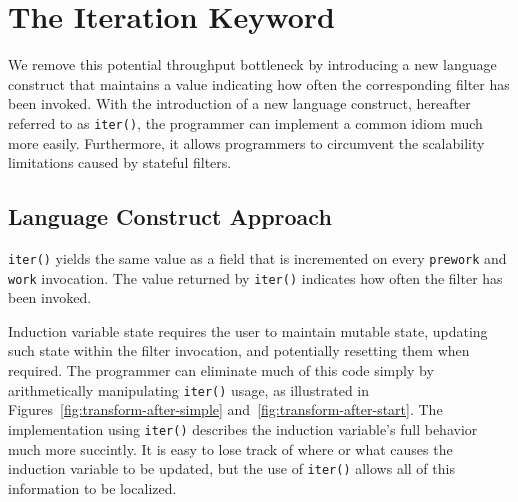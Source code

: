 %  
%
%
%
%
%
%    
%
%

\section{The Iteration Keyword}
\label{sec:iteration}
We remove this potential throughput bottleneck by 
introducing a new language construct that maintains a value 
indicating how often the corresponding filter has been invoked.  
With the introduction of a new language construct, hereafter referred to as {\tt iter()}, the programmer can implement a common idiom much more easily.  Furthermore, it allows programmers to circumvent the scalability limitations caused by stateful filters.

\subsection{Language Construct Approach}
{\tt iter()} yields the same value as a field that is incremented on every {\tt prework} and {\tt work} invocation.  The value returned by {\tt iter()} indicates how often the filter has been invoked.  

Induction variable state requires the user to maintain mutable state, updating such state within the filter invocation, and potentially resetting them when required. The programmer can eliminate much of this code simply by arithmetically manipulating {\tt iter()} usage, as illustrated in Figures~\ref{fig:transform-after-simple} and~\ref{fig:transform-after-start}.  The implementation using {\tt iter()} describes the induction variable's full behavior much more succintly.  It is easy to lose track of where or what causes the induction variable to be updated, but the use of {\tt iter()} allows all of this information to be localized.

